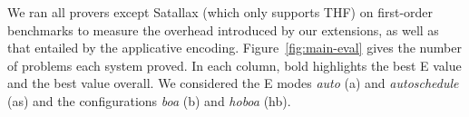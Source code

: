 We ran all provers except Satallax (which only supports THF) on first-order
benchmarks to measure the overhead introduced by our extensions, as
well as that entailed by the applicative encoding.
Figure~\ref{fig:main-eval} gives the number of problems each system proved.
In each column, bold highlights the best E value and the best value
overall.
We considered the E modes \emph{auto} (a) and
\emph{autoschedule} (as) and the configurations \emph{boa} (b) and
\emph{hoboa} (hb).

\begin{figure}[t]
\center
{}
\end{figure}
